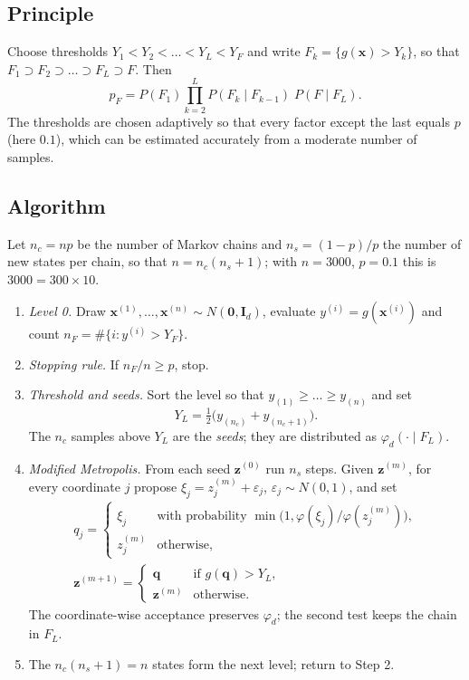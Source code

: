 \documentclass[11pt,a4paper]{article}
\theoremstyle{definition}
\theoremstyle{remark}
\newcommand{\x}{\mathbf{x}}
\begin{document}
\subsection{Principle}

Choose thresholds $Y_1 < Y_2 < \dots < Y_L < Y_F$ and write $F_k = \{g(\x) > Y_k\}$, so that
$F_1 \supset F_2 \supset \dots \supset F_L \supset F$. Then
\begin{equation}\label{eq:sus}
p_F = P(F_1) \prod_{k=2}^{L} P(F_k \mid F_{k-1}) \; P(F \mid F_L).
\end{equation}
The thresholds are chosen adaptively so that every factor except the last equals $p$ (here $0.1$),
which can be estimated accurately from a moderate number of samples.

\subsection{Algorithm}

Let $n_c = np$ be the number of Markov chains and $n_s = (1-p)/p$ the number of new states per chain,
so that $n = n_c(n_s + 1)$; with $n = 3000$, $p = 0.1$ this is $3000 = 300 \times 10$.

\begin{enumerate}[label=\textbf{Step \arabic*.}, leftmargin=*]
\item \emph{Level 0.} Draw $\x^{(1)}, \dots, \x^{(n)} \sim N(\mathbf{0}, \mathbf{I}_d)$, evaluate
$y^{(i)} = g(\x^{(i)})$ and count $n_F = \#\{i : y^{(i)} > Y_F\}$.
\item \emph{Stopping rule.} If $n_F / n \ge p$, stop.
\item \emph{Threshold and seeds.} Sort the level so that $y_{(1)} \ge \dots \ge y_{(n)}$ and set
\begin{equation}
Y_L = \tfrac12\big(y_{(n_c)} + y_{(n_c+1)}\big).
\end{equation}
The $n_c$ samples above $Y_L$ are the \emph{seeds}; they are distributed as $\varphi_d(\cdot \mid F_L)$.
\item \emph{Modified Metropolis.} From each seed $\mathbf{z}^{(0)}$ run $n_s$ steps. Given
$\mathbf{z}^{(m)}$, for every coordinate $j$ propose $\xi_j = z_j^{(m)} + \varepsilon_j$,
$\varepsilon_j \sim N(0,1)$, and set
\begin{gather}
q_j = \begin{cases} \xi_j & \text{with probability } \min\!\big(1, \varphi(\xi_j)/\varphi(z_j^{(m)})\big), \\ z_j^{(m)} & \text{otherwise}, \end{cases}
\\
\mathbf{z}^{(m+1)} = \begin{cases} \mathbf{q} & \text{if } g(\mathbf{q}) > Y_L, \\ \mathbf{z}^{(m)} & \text{otherwise.} \end{cases}
\end{gather}
The coordinate-wise acceptance preserves $\varphi_d$; the second test keeps the chain in $F_L$.
\item The $n_c(n_s+1) = n$ states form the next level; return to Step 2.
\end{enumerate}
\end{document}
